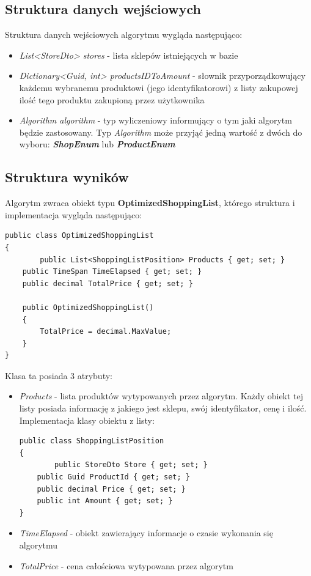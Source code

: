 \documentclass[a4paper]{article}
\begin{document}
\subsection{Struktura danych wejściowych}
Struktura danych wejściowych algorytmu wygląda następująco:
\begin{itemize}
\item \textit{List<StoreDto> stores} - lista sklepów istniejących w bazie
\item \textit{Dictionary<Guid, int> productsIDToAmount} - słownik przyporządkowujący każdemu wybranemu produktowi (jego identyfikatorowi) z listy zakupowej ilość tego produktu zakupioną przez użytkownika
\item \textit{Algorithm algorithm} - typ wyliczeniowy informujący o tym jaki algorytm będzie zastosowany. Typ \textit{Algorithm} może przyjąć jedną wartość z dwóch do wyboru:
\newline \textit{\textbf{ShopEnum}} lub \textit{\textbf{ProductEnum}}
\end{itemize}
\subsection{Struktura wyników}
Algorytm zwraca obiekt typu \textbf{OptimizedShoppingList}, którego struktura i implementacja wygląda następująco:
\newline
\lstset{style=sharpc}
\begin{lstlisting}
public class OptimizedShoppingList
{
		public List<ShoppingListPosition> Products { get; set; }
    public TimeSpan TimeElapsed { get; set; }
    public decimal TotalPrice { get; set; }

    public OptimizedShoppingList()
    {
    	TotalPrice = decimal.MaxValue;
    }
}
\end{lstlisting}
\newpage
Klasa ta posiada 3 atrybuty:
\begin{itemize}
\item \textit{Products} - lista produktów wytypowanych przez algorytm. Każdy obiekt tej listy posiada informację z jakiego jest sklepu, swój identyfikator, cenę i ilość. Implementacja klasy obiektu z listy:
\newline
\begin{lstlisting}
public class ShoppingListPosition
{
		public StoreDto Store { get; set; }
    public Guid ProductId { get; set; }
    public decimal Price { get; set; }
    public int Amount { get; set; }
}  
\end{lstlisting}
\item \textit{TimeElapsed} - obiekt zawierający informacje o czasie wykonania się algorytmu
\item \textit{TotalPrice} - cena całościowa wytypowana przez algorytm
\end{itemize}
\end{document}
